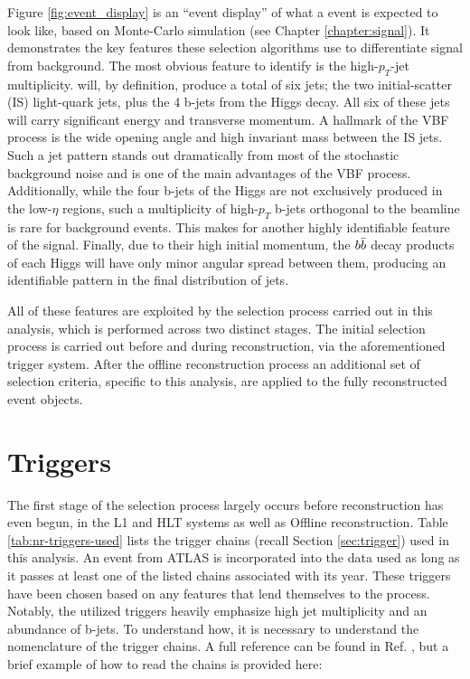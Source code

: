     Figure \ref{fig:event_display} is an ``event display'' of what a \vbfhhproc event is expected to look like,
        based on Monte-Carlo simulation (see Chapter \ref{chapter:signal}).
    It demonstrates the key features these selection algorithms use to differentiate signal from background.
    The most obvious feature to identify is the high-$p_T$-jet multiplicity.
    \vbfproc will, by definition, produce a total of six jets;
        the two initial-scatter (IS) light-quark jets, plus the 4 b-jets from the Higgs decay.
    All six of these jets will carry significant energy and transverse momentum.
    A hallmark of the VBF process is the wide opening angle and high invariant mass between the IS jets.
    Such a jet pattern stands out dramatically from most of the stochastic background noise
        and is one of the main advantages of the VBF process.
    Additionally, while the four b-jets of the Higgs are not exclusively produced in the low-$\eta$ regions,
        such a multiplicity of high-$p_T$ b-jets orthogonal to the beamline is rare for background events.
    This makes for another highly identifiable feature of the signal.
    Finally, due to their high initial momentum,
        the $b \bar{b}$ decay products of each Higgs will have only minor angular spread between them,
        producing an identifiable pattern in the final distribution of jets.

    All of these features are exploited by the selection process carried out in this analysis,
        which is performed across two distinct stages.
    The initial selection process is carried out before and during reconstruction, via the aforementioned trigger system.
    After the offline reconstruction process an additional set of selection criteria,
        specific to this analysis, are applied to the fully reconstructed event objects.
    
    \FloatBarrier
    \section{Triggers}
        
        The first stage of the selection process largely occurs before reconstruction has even begun,
            in the L1 and HLT systems as well as Offline reconstruction.
        Table \ref{tab:nr-triggers-used} lists the trigger chains (recall Section \ref{sec:trigger}) used in this analysis.
        An event from ATLAS is incorporated into the data used as long as it passes at least one 
            of the listed chains associated with its year.
        These triggers have been chosen based on any features that lend themselves to the \vbfproc process.
        Notably, the utilized triggers heavily emphasize high jet multiplicity and an abundance of b-jets.
        To understand how, it is necessary to understand the nomenclature of the trigger chains.
        A full reference can be found in Ref. \cite{trigger_naming},
            but a brief example of how to read the chains is provided here:

